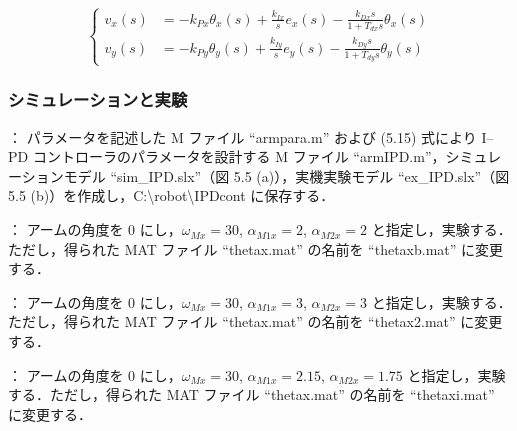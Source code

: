 \begin{equation}
\left\{
\begin{aligned}
v_x(s) &= -k_{Px} \theta_x(s) + \frac{k_{Ix}}{s} e_x(s) - \frac{k_{Dx}s}{1 + T_{dx}s} \theta_x(s) \\
v_y(s) &= -k_{Py} \theta_y(s) + \frac{k_{Iy}}{s} e_y(s) - \frac{k_{Dy}s}{1 + T_{dy}s} \theta_y(s)
\end{aligned}
\right.
\tag{5.16}
\end{equation}

\subsubsection{シミュレーションと実験}
：
パラメータを記述した M ファイル ``armpara.m'' および (5.15) 式により I--PD コントローラのパラメータを設計する M ファイル ``armIPD.m''，シミュレーションモデル ``sim\_IPD.slx''（図 5.5 (a)），実機実験モデル ``ex\_IPD.slx''（図 5.5 (b)）を作成し，C:\textbackslash robot\textbackslash IPDcont に保存する．

：
アームの角度を 0 にし，$\omega_{Mx} = 30$, $\alpha_{M1x} = 2$, $\alpha_{M2x} = 2$ と指定し，実験する．ただし，得られた MAT ファイル ``thetax.mat'' の名前を ``thetaxb.mat'' に変更する．

：
アームの角度を 0 にし，$\omega_{Mx} = 30$, $\alpha_{M1x} = 3$, $\alpha_{M2x} = 3$ と指定し，実験する．ただし，得られた MAT ファイル ``thetax.mat'' の名前を ``thetax2.mat'' に変更する．

：
アームの角度を 0 にし，$\omega_{Mx} = 30$, $\alpha_{M1x} = 2.15$, $\alpha_{M2x} = 1.75$ と指定し，実験する．ただし，得られた MAT ファイル ``thetax.mat'' の名前を ``thetaxi.mat'' に変更する．

